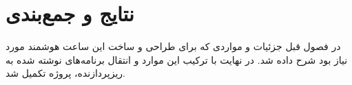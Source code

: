\chapter{نتایج و جمع‌بندی} \label{sec:result}

در فصول قبل جزئیات و مواردی که برای طراحی و ساخت این ساعت هوشمند مورد نیاز بود شرح داده شد. در نهایت با ترکیب این موارد و انتقال برنامه‌های نوشته شده به ریزپردازنده، پروژه تکمیل شد.